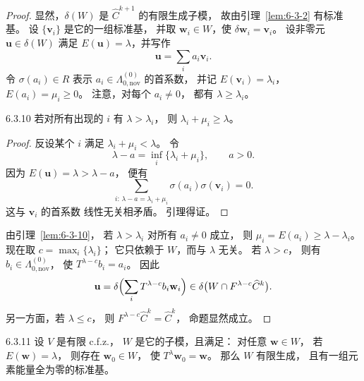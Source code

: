 \begin{proof}
显然，$\delta(W)$ 是 $\widehat C^{k+1}$
的有限生成子模，
故由引理~\ref{lem:6-3-2} 有标准基。
设 $\{\mathbf v_i\}$ 是它的一组标准基，
并取 $\mathbf w_i\in W$，使
$\delta\mathbf w_i=\mathbf v_i$。
设非零元 $\mathbf u\in\delta(W)$
满足 $E(\mathbf u)=\lambda$，并写作
\[
\mathbf u=\sum_i a_i\mathbf v_i.
\]
令 $\sigma(a_i)\in R$ 表示
$a_i\in\Lambda_{0,\mathrm{nov}}^{(0)}$
的首系数，
并记 $E(\mathbf v_i)=\lambda_i$，
$E(a_i)=\mu_i\ge0$。
注意，对每个 $a_i\ne0$，
都有 $\lambda\ge\lambda_i$。

\pagebreak
\begin{lemma}{6.3.10}\label{lem:6-3-10}
若对所有出现的 $i$ 有 $\lambda>\lambda_i$，
则 $\lambda_i+\mu_i\ge\lambda$。
\end{lemma}

\begin{proof}
反设某个 $i$ 满足
$\lambda_i+\mu_i<\lambda$。
令
\[
\lambda-a
=\inf_i\{\lambda_i+\mu_i\},
\qquad a>0.
\]
因为 $E(\mathbf u)=\lambda>\lambda-a$，
便有
\[
\sum_{i:\,\lambda-a=\lambda_i+\mu_i}
\sigma(a_i)\sigma(\mathbf v_i)=0.
\]
这与 $\mathbf v_i$ 的首系数
线性无关相矛盾。
引理得证。
\end{proof}

由引理~\ref{lem:6-3-10}，
若 $\lambda>\lambda_i$ 对所有
$a_i\ne0$ 成立，
则 $\mu_i=E(a_i)\ge\lambda-\lambda_i$。
现在取 $c=\max_i\{\lambda_i\}$；
它只依赖于 $W$，而与 $\lambda$ 无关。
若 $\lambda>c$，
则有 $b_i\in\Lambda_{0,\mathrm{nov}}^{(0)}$，
使 $T^{\lambda-c}b_i=a_i$。
因此
\[
\mathbf u
=\delta\Bigl(
\sum_i T^{\lambda-c}b_i\mathbf w_i
\Bigr)
\in
\delta\bigl(W\cap F^{\lambda-c}\widehat C^k\bigr).
\]
另一方面，若 $\lambda\le c$，
则 $F^{\lambda-c}\widehat C^k=\widehat C^k$，
命题显然成立。
\end{proof}

\begin{lemma}{6.3.11}\label{lem:6-3-11}
设 $V$ 是有限 c.f.z.，
$W$ 是它的子模，且满足：
对任意 $\mathbf w\in W$，
若 $E(\mathbf w)=\lambda$，
则存在 $\mathbf w_0\in W$，
使 $T^\lambda\mathbf w_0=\mathbf w$。
那么 $W$ 有限生成，
且有一组元素能量全为零的标准基。
\end{lemma}

